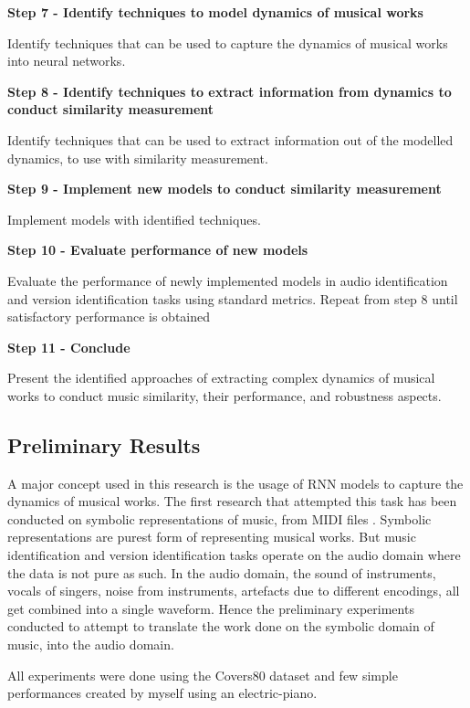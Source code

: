 \documentclass[../main.tex]{subfiles}
\begin{document}
\textbf{Step 7 - Identify techniques to model dynamics of musical works}
\par
Identify techniques that can be used to capture the dynamics of musical works into neural networks.

\textbf{Step 8 - Identify techniques to extract information from dynamics to conduct similarity measurement}
\par
Identify techniques that can be used to extract information out of the modelled dynamics, to use with similarity measurement.

\textbf{Step 9 - Implement new models to conduct similarity measurement}
\par
Implement models with identified techniques.


\textbf{Step 10 - Evaluate performance of new models}
\par
Evaluate the performance of newly implemented models in audio identification and version identification tasks using standard metrics. Repeat from step 8 until satisfactory performance is obtained


\textbf{Step 11 - Conclude}
\par
Present the identified approaches of extracting complex dynamics of musical works to conduct music similarity, their performance, and robustness aspects.

\newpage
\subsection{Preliminary Results}

\par
A major concept used in this research is the usage of \gls{RNN} models to capture the dynamics of musical works. The first research that attempted this task has been conducted on symbolic representations of music, from MIDI files \cite{tian_cheng_comparing_2018}. Symbolic representations are purest form of representing musical works. But music identification and version identification tasks operate on the audio domain where the data is not pure as such. In the audio domain, the sound of instruments, vocals of singers, noise from instruments, artefacts due to different encodings, all get combined into a single waveform. Hence the preliminary experiments conducted to attempt to translate the work done on the symbolic domain of music, into the audio domain.

\par
All experiments were done using the Covers80\cite{Covers80CoverSong} dataset and few simple performances created by myself using an electric-piano.
\end{document}
